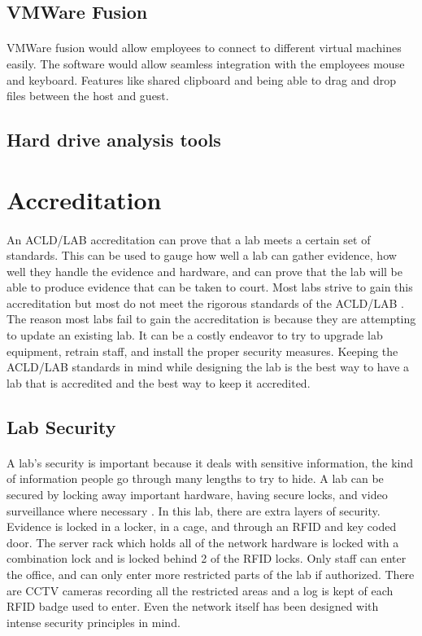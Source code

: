 \documentclass[12pt]{article}
\begin{document}
\subsection{VMWare Fusion} 
\paragraph{}
VMWare fusion would allow employees to connect to different virtual machines easily.
The software would allow seamless integration with the employees mouse and keyboard. 
Features like shared clipboard and being able to drag and drop files between the host and guest.
\subsection{Hard drive analysis tools}


\section{Accreditation}
\paragraph{} 
An ACLD/LAB accreditation can prove that a lab meets a certain set of standards.
This can be used to gauge how well a lab can gather evidence, how well they handle the evidence and hardware, and can prove that the lab will be able to produce evidence that can be taken to court.
Most labs strive to gain this accreditation but most do not meet the rigorous standards of the ACLD/LAB \cite{hayes}.
The reason most labs fail to gain the accreditation is because they are attempting to update an existing lab.
It can be a costly endeavor to try to upgrade lab equipment, retrain staff, and install the proper security measures.
Keeping the ACLD/LAB standards in mind while designing the lab is the best way to have a lab that is accredited and the best way to keep it accredited.
\subsection{Lab Security}
\paragraph{}
A lab's security is important because it deals with sensitive information, the kind of information people go through many lengths to try to hide.  
A lab can be secured by locking away important hardware, having secure locks, and video surveillance where necessary \cite{website}.
In this lab, there are extra layers of security.
Evidence is locked in a locker, in a cage, and through an RFID and key coded door.
The server rack which holds all of the network hardware is locked with a combination lock and is locked behind 2 of the RFID locks.
Only staff can enter the office, and can only enter more restricted parts of the lab if authorized.
There are CCTV cameras recording all the restricted areas and a log is kept of each RFID badge used to enter.
Even the network itself has been designed with intense security principles in mind.
\end{document}
